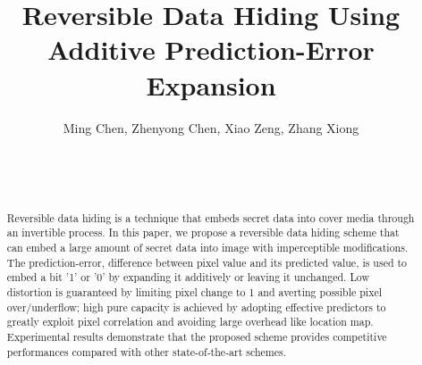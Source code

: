 \documentclass{sig-alternate}
\begin{document}

\title{Reversible Data Hiding Using Additive Prediction-Error Expansion}

\author{
\alignauthor Ming Chen, Zhenyong Chen, Xiao Zeng, Zhang Xiong \\
  \\
  \\
  \\
}

\maketitle

\begin{abstract}
Reversible data hiding is a technique that embeds secret data into cover media through an invertible
process. In this paper, we propose a reversible data hiding scheme that can embed a large amount of
secret data into image with imperceptible modifications. The prediction-error, difference between
pixel value and its predicted value, is used to embed a bit '1' or '0' by expanding it additively or
leaving it unchanged. Low distortion is guaranteed by limiting pixel change to 1 and averting
possible pixel over/underflow; high pure capacity is achieved by adopting effective predictors to
greatly exploit pixel correlation and avoiding large overhead like location map. Experimental
results demonstrate that the proposed scheme provides competitive performances compared with other
state-of-the-art schemes. 
\end{abstract}



\end{document}
